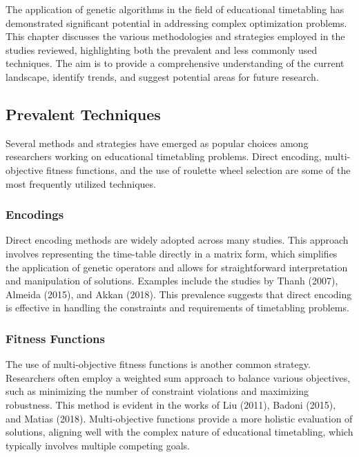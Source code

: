\documentclass[sigconf]{acmart}
\begin{document}

The application of genetic algorithms in the field of educational timetabling
has demonstrated significant potential in addressing complex optimization
problems. This chapter discusses the various methodologies and strategies
employed in the studies reviewed, highlighting both the prevalent and less
commonly used techniques. The aim is to provide a comprehensive understanding
of the current landscape, identify trends, and suggest potential areas for
future research.

\subsection{Prevalent Techniques}
Several methods and strategies have emerged as popular choices among researchers
working on educational timetabling problems. Direct encoding, multi-objective
fitness functions, and the use of roulette wheel selection are some of the most
frequently utilized techniques.

\subsubsection{Encodings}
Direct encoding methods are widely adopted across many studies. This approach
involves representing the time-table directly in a matrix form, which simplifies
the application of genetic operators and allows for straightforward
interpretation and manipulation of solutions.
Examples include the studies by Thanh (2007), Almeida (2015), and Akkan (2018).
This prevalence suggests that direct encoding is effective in handling the
constraints and requirements of timetabling problems.

\subsubsection{Fitness Functions}
The use of multi-objective fitness functions is another common strategy.
Researchers often employ a weighted sum approach to balance various objectives,
such as minimizing the number of constraint violations and maximizing
robustness. This method is evident in the works of Liu (2011), Badoni (2015),
and Matias (2018). Multi-objective functions provide a more holistic evaluation
of solutions, aligning well with the complex nature of educational timetabling,
which typically involves multiple competing goals.
\end{document}
